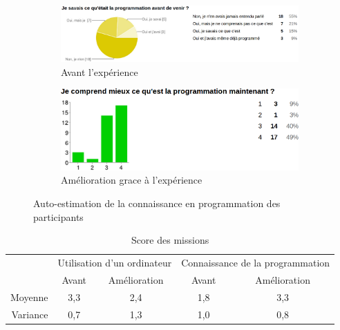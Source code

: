 \begin{figure}
  \begin{center}
    \begin{subfigure}[b]{\textwidth}
      \begin{center}
        \includegraphics[width=.7\textwidth]{content/8-validation/images/programmation}
        \caption{Avant l'expérience}
      \end{center}
    \end{subfigure}
    \begin{subfigure}[b]{\textwidth}
      \begin{center}
        \includegraphics[width=.5\textwidth]{content/8-validation/images/apres-programmation}
        \caption{Amélioration grace à l'expérience}
      \end{center}
    \end{subfigure}
    \caption{Auto-estimation de la connaissance en programmation des participants}
    \label{fig:niveau-prog}
  \end{center}
\end{figure}

\begin{table}
  \begin{center}
    \begin{tabular}{r|cc|cc}
               & \multicolumn{2}{c|}{Utilisation d'un ordinateur} & \multicolumn{2}{c}{Connaissance de la programmation} \\
               & Avant & Amélioration                             & Avant & Amélioration \\ \hline
      Moyenne  & 3,3 & 2,4 & 1,8 & 3,3 \\
      Variance & 0,7 & 1,3 & 1,0 & 0,8 \\
    \end{tabular}
  \end{center}
  \caption{Score des missions}
  \label{tab:form-info}
\end{table}

